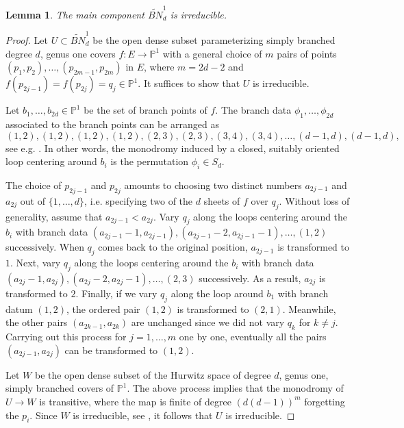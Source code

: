 \documentclass[11]{amsart}
\theoremstyle{plain}
\newtheorem{lemma}[theorem]{Lemma}
\theoremstyle{definition}
\newcommand{\wt}{\widetilde}
\newcommand{\bbP}{\mathbb P}
\begin{document}
\begin{lemma}
\label{lem:d-gonal-irreducible}
The main component $\wt{BN}^1_d$ is irreducible. 
\end{lemma}

\begin{proof}
Let $U\subset \wt{BN}^1_d$ be the open dense subset parameterizing simply branched degree $d$, genus one covers 
$f: E\to \bbP^1$ with a general choice of $m$ pairs of points $(p_1, p_2), \ldots, (p_{2m-1}, p_{2m})$ in $E$, where $m = 2d-2$ and $f(p_{2j-1}) = f(p_{2j}) = q_j \in \bbP^1$. It suffices to show that $U$ is irreducible. 

Let $b_1, \ldots, b_{2d}\in \bbP^1$ be the set of branch points of $f$. The branch data $\phi_1, \ldots, \phi_{2d}$ associated to the branch points can be arranged as 
$$(1,2), (1,2), (1,2), (1,2), (2, 3), (2, 3), (3, 4), (3, 4), \ldots, (d-1, d), (d-1, d),$$ 
see e.g. \cite[page 100]{EEHS}. In other words, the monodromy induced by a closed, suitably oriented loop centering around $b_i$ is the permutation $\phi_i \in S_d$. 

The choice of $p_{2j-1}$ and $p_{2j}$ amounts to choosing two distinct numbers $a_{2j-1}$ and $a_{2j}$ out of 
$\{ 1, \ldots, d \}$, i.e. specifying two of the $d$ sheets of $f$ over $q_j$. Without loss of generality, assume that 
$a_{2j-1} < a_{2j}$. Vary $q_j$ along the loops centering around the $b_i$ with branch data $(a_{2j-1}-1, a_{2j-1}), (a_{2j-1}-2, a_{2j-1}-1), 
\ldots, (1, 2)$ successively. When $q_j$ comes back to the original position, $a_{2j-1}$ is transformed to $1$. Next, 
vary $q_j$ along the loops centering around the $b_i$ with branch data $(a_{2j}-1, a_{2j}), (a_{2j}-2, a_{2j}-1), 
\ldots, (2, 3)$ successively. As a result, $a_{2j}$ is transformed to $2$. Finally, if we vary $q_j$ along the loop around $b_1$ with branch datum $(1,2)$, the ordered pair $(1, 2)$ is transformed to $(2,1)$. Meanwhile, the other pairs 
$(a_{2k-1}, a_{2k})$ are unchanged since we did not vary $q_k$ for $k\neq j$. Carrying out this process for 
$j=1,\ldots, m$ one by one, eventually all the pairs $(a_{2j-1}, a_{2j})$ can be transformed to $(1,2)$. 

Let $W$ be the open dense subset of the Hurwitz space of degree $d$, genus one, simply branched covers of $\bbP^1$. The above process implies that the monodromy 
of $U\to W$ is transitive, where the map is finite of degree $(d(d-1))^{m}$ forgetting the $p_i$. 
Since $W$ is irreducible, see \cite{Hurwitz, EEHS}, it follows that $U$ is irreducible.  
\end{proof}
\end{document}
